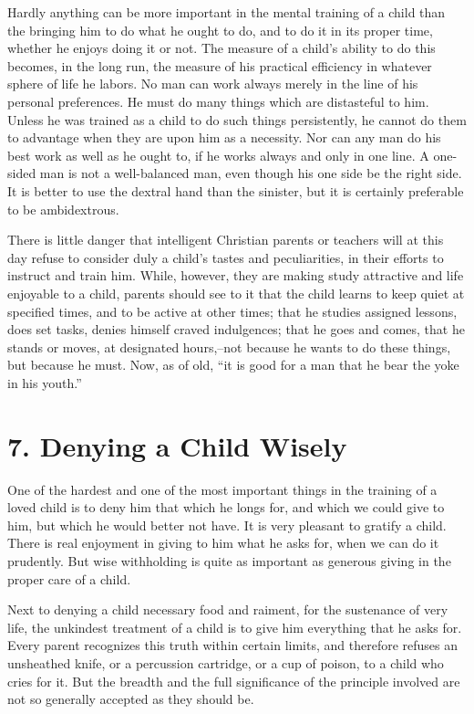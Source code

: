\documentclass[
]{book}
\begin{document}
Hardly anything can be more important in the mental training of a child than the bringing him to do what he ought to do, and to do it in its proper time, whether he enjoys doing it or not. The measure of a child's ability to do this becomes, in the long run, the measure of his practical efficiency in whatever sphere of life he labors. No man can work always merely in the line of his personal preferences. He must do many things which are distasteful to him. Unless he was trained as a child to do such things persistently, he cannot do them to advantage when they are upon him as a necessity. Nor can any man do his best work as well as he ought to, if he works always and only in one line. A one-sided man is not a well-balanced man, even though his one side be the right side. It is better to use the dextral hand than the sinister, but it is certainly preferable to be ambidextrous.

There is little danger that intelligent Christian parents or teachers will at this day refuse to consider duly a child's tastes and peculiarities, in their efforts to instruct and train him. While, however, they are making study attractive and life enjoyable to a child, parents should see to it that the child learns to keep quiet at specified times, and to be active at other times; that he studies assigned lessons, does set tasks, denies himself craved indulgences; that he goes and comes, that he stands or moves, at designated hours,--not because he wants to do these things, but because he must. Now, as of old, ``it is good for a man that he bear the yoke in his youth.''

\hypertarget{denying-a-child-wisely}{%
\chapter{7. Denying a Child Wisely}\label{denying-a-child-wisely}}

One of the hardest and one of the most important things in the training of a loved child is to deny him that which he longs for, and which we could give to him, but which he would better not have. It is very pleasant to gratify a child. There is real enjoyment in giving to him what he asks for, when we can do it prudently. But wise withholding is quite as important as generous giving in the proper care of a child.

Next to denying a child necessary food and raiment, for the sustenance of very life, the unkindest treatment of a child is to give him everything that he asks for. Every parent recognizes this truth within certain limits, and therefore refuses an unsheathed knife, or a percussion cartridge, or a cup of poison, to a child who cries for it. But the breadth and the full significance of the principle involved are not so generally accepted as they should be.
\end{document}
